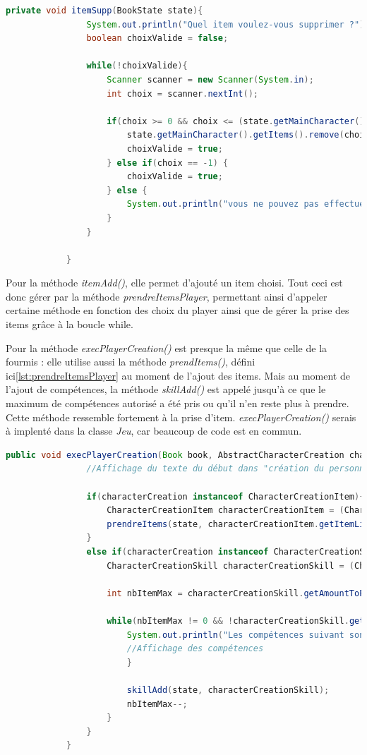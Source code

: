 		\begin{lstlisting}[gobble=12, language=java, caption=itemSupp()]
			private void itemSupp(BookState state){
				System.out.println("Quel item voulez-vous supprimer ?");
				boolean choixValide = false;

				while(!choixValide){
					Scanner scanner = new Scanner(System.in);
					int choix = scanner.nextInt();

					if(choix >= 0 && choix <= (state.getMainCharacter().getItems().size()-1)){
						state.getMainCharacter().getItems().remove(choix);
						choixValide = true;
					} else if(choix == -1) {
						choixValide = true;
					} else {
						System.out.println("vous ne pouvez pas effectuer ce choix");
					}
				}

			}
		\end{lstlisting}

		Pour la méthode \textit{itemAdd()}, elle permet d'ajouté un item choisi.
		Tout ceci est donc gérer par la méthode \textit{prendreItemsPlayer}, permettant ainsi d'appeler certaine méthode en fonction des choix du player ainsi que de gérer la prise des items grâce à la boucle while.


		Pour la méthode \textit{execPlayerCreation()} est presque la même que celle de la fourmis : elle utilise aussi la méthode \textit{prendItems()}, défini ici\ref{lst:prendreItemsPlayer} au moment de l'ajout des items. Mais au moment de l'ajout de compétences, la méthode \textit{skillAdd()} est appelé jusqu'à ce que le maximum de compétences autorisé a été pris ou qu'il n'en reste plus à prendre. Cette méthode ressemble fortement à la prise d'item. \textit{execPlayerCreation()} serais à implenté dans la classe \textit{Jeu}, car beaucoup de code est en commun.\\

		\begin{lstlisting}[gobble=12, language=java, caption=execPlayerCreation() du Player]
			public void execPlayerCreation(Book book, AbstractCharacterCreation characterCreation, BookState state){
				//Affichage du texte du début dans "création du personnage"

				if(characterCreation instanceof CharacterCreationItem){
					CharacterCreationItem characterCreationItem = (CharacterCreationItem) characterCreation;
					prendreItems(state, characterCreationItem.getItemLinks(), characterCreationItem.getAmountToPick());
				}
				else if(characterCreation instanceof CharacterCreationSkill){
					CharacterCreationSkill characterCreationSkill = (CharacterCreationSkill) characterCreation;

					int nbItemMax = characterCreationSkill.getAmountToPick();

					while(nbItemMax != 0 && !characterCreationSkill.getSkillLinks().isEmpty()){
						System.out.println("Les compétences suivant sont disponible:");
						//Affichage des compétences
						}

						skillAdd(state, characterCreationSkill);
						nbItemMax--;
					}
				}
			}
			\end{lstlisting}


